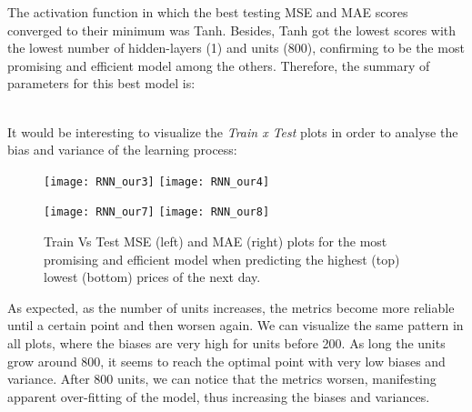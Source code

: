 The activation function in which the best testing MSE and MAE scores converged to their minimum was Tanh. Besides, Tanh got the lowest scores with the lowest number of hidden-layers (1) and units (800), confirming to be the most promising and efficient model among the others. Therefore, the summary of parameters for this best model is: \\

\begin{table}[H]
\centering
{}
\label{table:Tanh, 1, 800, 50, 1, MSE}
\caption{Summary of parameters for our best model.}
\end{table}\\

It would be interesting to visualize the \textit{Train x Test} plots in order to analyse the bias and variance of the learning process:\\

\begin{figure}[H]
\label{fig:RNN train vs test for highest}
\centering
\texttt{[image: RNN\_our3]}
\texttt{[image: RNN\_our4]}
\end{figure}

\begin{figure}[H]
\label{fig:RNN train vs test for lowest}
\centering
\texttt{[image: RNN\_our7]}
\texttt{[image: RNN\_our8]}
\caption{Train Vs Test MSE (left) and MAE (right) plots for the most promising and efficient model when predicting the highest (top) lowest (bottom) prices of the next day.}
\end{figure}

As expected, as the number of units increases, the metrics become more reliable until a certain point and then worsen again. We can visualize the same pattern in all plots, where the biases are very high for units before 200. As long the units grow around 800, it seems to reach the optimal point with very low biases and variance. After 800 units, we can notice that the metrics worsen, manifesting apparent over-fitting of the model, thus increasing the biases and variances.\\

